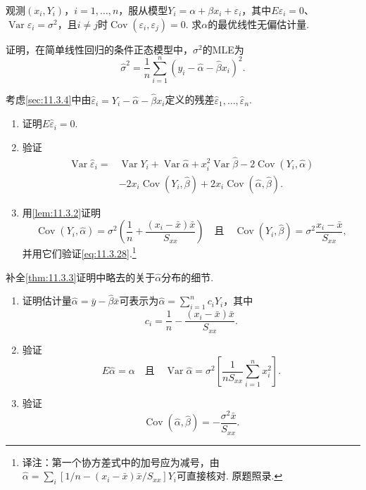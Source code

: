 \begin{exercise}\label{exercise:11.27}
观测$(x_i,Y_i)$，$i=1,\ldots,n$，服从模型$Y_i=\alpha+\beta x_i+\varepsilon_i$，其中$E\varepsilon_i=0$、$\operatorname{Var}\varepsilon_i=\sigma^2$，且$i\ne j$时$\operatorname{Cov}(\varepsilon_i,\varepsilon_j)=0$. 求$\alpha$的最优线性无偏估计量.
\end{exercise}

\begin{exercise}\label{exercise:11.28}
证明，在简单线性回归的条件正态模型中，$\sigma^2$的MLE为
$$\hat\sigma^2=\frac1n\sum_{i=1}^n(y_i-\hat\alpha-\hat\beta x_i)^2.$$
\end{exercise}

\begin{exercise}\label{exercise:11.29}
考虑\autoref{sec:11.3.4}中由$\hat\varepsilon_i=Y_i-\hat\alpha-\hat\beta x_i$定义的残差$\hat\varepsilon_1,\ldots,\hat\varepsilon_n$.
\begin{enumerate}[label=(\alph*)]
\item\label{item:11.29.a} 证明$E\hat\varepsilon_i=0$.
\item\label{item:11.29.b} 验证
$$\begin{aligned}
\operatorname{Var}\hat\varepsilon_i
={}&\operatorname{Var}Y_i+\operatorname{Var}\hat\alpha+x_i^2\operatorname{Var}\hat\beta
-2\operatorname{Cov}(Y_i,\hat\alpha)\\
&-2x_i\operatorname{Cov}(Y_i,\hat\beta)+2x_i\operatorname{Cov}(\hat\alpha,\hat\beta).
\end{aligned}$$
\item\label{item:11.29.c} 用\autoref{lem:11.3.2}证明
$$\operatorname{Cov}(Y_i,\hat\alpha)=\sigma^2\left(\frac1n+\frac{(x_i-\bar x)\bar x}{S_{xx}}\right)
\quad\text{且}\quad\operatorname{Cov}(Y_i,\hat\beta)=\sigma^2\frac{x_i-\bar x}{S_{xx}},$$
并用它们验证\eqref{eq:11.3.28}.\footnote{译注：第一个协方差式中的加号应为减号，由$\hat\alpha=\sum_i[1/n-(x_i-\bar x)\bar x/S_{xx}]Y_i$可直接核对. 原题照录.}
\end{enumerate}
\end{exercise}

\begin{exercise}\label{exercise:11.30}
补全\autoref{thm:11.3.3}证明中略去的关于$\hat\alpha$分布的细节.
\begin{enumerate}[label=(\alph*)]
\item\label{item:11.30.a} 证明估计量$\hat\alpha=\bar y-\hat\beta\bar x$可表示为$\hat\alpha=\sum_{i=1}^nc_iY_i$，其中
$$c_i=\frac1n-\frac{(x_i-\bar x)\bar x}{S_{xx}}.$$
\item\label{item:11.30.b} 验证
$$E\hat\alpha=\alpha\quad\text{且}\quad\operatorname{Var}\hat\alpha=\sigma^2\left[\frac1{nS_{xx}}\sum_{i=1}^nx_i^2\right].$$
\item\label{item:11.30.c} 验证
$$\operatorname{Cov}(\hat\alpha,\hat\beta)=-\frac{\sigma^2\bar x}{S_{xx}}.$$
\end{enumerate}
\end{exercise}

